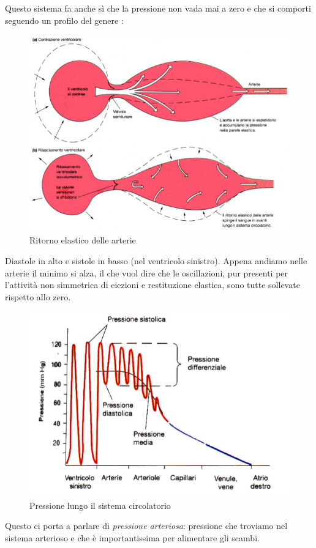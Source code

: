 \documentclass[a4paper,12pt]{article}
\begin{document}
Questo sistema fa anche sì che la pressione non vada mai a zero e che si comporti seguendo un profilo del genere :
\begin{figure}[H]
\centering
\includegraphics[scale=0.4]{immagine/ritorno.jpg}
\caption{Ritorno elastico delle arterie}
\end{figure}
Diastole in alto e sistole in basso (nel ventricolo sinistro). Appena andiamo nelle arterie il minimo si alza, il che vuol dire che le oscillazioni, pur presenti per l'attività non simmetrica di eiezioni e restituzione elastica, sono tutte sollevate rispetto allo zero.
\begin{figure}[H]
\centering
\includegraphics[scale=0.4]{immagine/oscillazioni.jpg}
\caption{Pressione lungo il sistema circolatorio}
\end{figure}
 Questo ci porta a parlare di \emph{pressione arteriosa}: pressione che troviamo nel sistema arterioso e che è importantissima per alimentare gli scambi.
\end{document}
